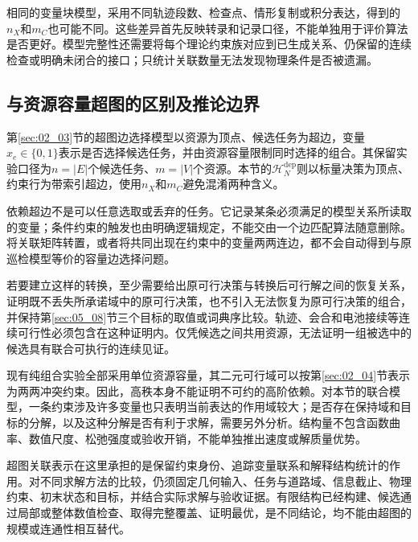 相同的变量块模型，采用不同轨迹段数、检查点、情形复制或积分表达，得到的$n_X$和$m_C$也可能不同。这些差异首先反映转录和记录口径，不能单独用于评价算法是否更好。模型完整性还需要将每个理论约束族对应到已生成关系、仍保留的连续检查或明确未闭合的接口；只统计关联数量无法发现物理条件是否被遗漏。

\subsection{与资源容量超图的区别及推论边界}

第\ref{sec:02_03}节的超图边选择模型以资源为顶点、候选任务为超边，变量$x_e\in\{0,1\}$表示是否选择候选任务，并由资源容量限制同时选择的组合。其保留实验口径为$n=|E|$个候选任务、$m=|V|$个资源。本节的$\mathcal H_N^{\mathrm{dep}}$则以标量决策为顶点、约束行为带索引超边，使用$n_X$和$m_C$避免混淆两种含义。

依赖超边不是可以任意选取或丢弃的任务。它记录某条必须满足的模型关系所读取的变量；条件约束的触发也由明确逻辑规定，不能交由一个边匹配算法随意删除。将关联矩阵转置，或者将共同出现在约束中的变量两两连边，都不会自动得到与原巡检模型等价的容量边选择问题。

若要建立这样的转换，至少需要给出原可行决策与转换后可行解之间的恢复关系，证明既不丢失所承诺域中的原可行决策，也不引入无法恢复为原可行决策的组合，并保持第\ref{sec:05_08}节三个目标的取值或词典序比较。轨迹、会合和电池接续等连续可行性必须包含在这种证明内。仅凭候选之间共用资源，无法证明一组被选中的候选具有联合可执行的连续见证。

现有纯组合实验全部采用单位资源容量，其二元可行域可以按第\ref{sec:02_04}节表示为两两冲突约束。因此，高秩本身不能证明不可约的高阶依赖。对本节的联合模型，一条约束涉及许多变量也只表明当前表达的作用域较大；是否存在保持域和目标的分解，以及这种分解是否有利于求解，需要另外分析。结构量不包含函数曲率、数值尺度、松弛强度或验收开销，不能单独推出速度或解质量优势。

超图关联表示在这里承担的是保留约束身份、追踪变量联系和解释结构统计的作用。对不同求解方法的比较，仍须固定几何输入、任务与道路域、信息截止、物理约束、初末状态和目标，并结合实际求解与验收证据。有限结构已经构建、候选通过局部或整体数值检查、取得完整覆盖、证明最优，是不同结论，均不能由超图的规模或连通性相互替代。

